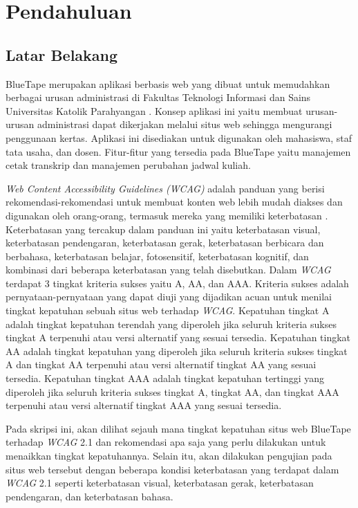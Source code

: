 \chapter{Pendahuluan}
\label{chap:pendahuluan}
   
\section{Latar Belakang}
\label{sec:latarbelakang}
BlueTape merupakan aplikasi berbasis web yang dibuat untuk memudahkan berbagai urusan administrasi di Fakultas Teknologi Informasi dan Sains Universitas Katolik Parahyangan \cite{BlueTape}. Konsep aplikasi ini yaitu membuat urusan-urusan administrasi dapat dikerjakan melalui situs web sehingga mengurangi penggunaan kertas. Aplikasi ini disediakan untuk digunakan oleh mahasiswa, staf tata usaha, dan dosen. Fitur-fitur yang tersedia pada BlueTape yaitu manajemen cetak transkrip dan manajemen perubahan jadwal kuliah.

\textit{Web Content Accessibility Guidelines (WCAG)} adalah panduan yang berisi rekomendasi-rekomendasi untuk membuat konten web lebih mudah diakses dan digunakan oleh orang-orang, termasuk mereka yang memiliki keterbatasan \cite{WCAG:2.1}. Keterbatasan yang tercakup dalam panduan ini yaitu keterbatasan visual, keterbatasan pendengaran, keterbatasan gerak, keterbatasan berbicara dan berbahasa, keterbatasan belajar, fotosensitif, keterbatasan kognitif, dan kombinasi dari beberapa keterbatasan yang telah disebutkan. Dalam \textit{WCAG} terdapat 3 tingkat kriteria sukses yaitu A, AA, dan AAA. Kriteria sukses adalah pernyataan-pernyataan yang dapat diuji yang dijadikan acuan untuk menilai tingkat kepatuhan sebuah situs web terhadap \textit{WCAG}. Kepatuhan tingkat A adalah tingkat kepatuhan terendah yang diperoleh jika seluruh kriteria sukses tingkat A terpenuhi atau versi alternatif yang sesuai tersedia. Kepatuhan tingkat AA adalah tingkat kepatuhan yang diperoleh jika seluruh kriteria sukses tingkat A dan tingkat AA terpenuhi atau versi alternatif tingkat AA yang sesuai tersedia. Kepatuhan tingkat AAA adalah tingkat kepatuhan tertinggi yang diperoleh jika seluruh kriteria sukses tingkat A, tingkat AA, dan tingkat AAA terpenuhi atau versi alternatif tingkat AAA yang sesuai tersedia.

Pada skripsi ini, akan dilihat sejauh mana tingkat kepatuhan situs web BlueTape terhadap \textit{WCAG} 2.1 dan rekomendasi apa saja yang perlu dilakukan untuk menaikkan tingkat kepatuhannya. Selain itu, akan dilakukan pengujian pada situs web tersebut dengan beberapa kondisi keterbatasan yang terdapat dalam \textit{WCAG} 2.1 seperti keterbatasan visual, keterbatasan gerak, keterbatasan pendengaran, dan keterbatasan bahasa.

